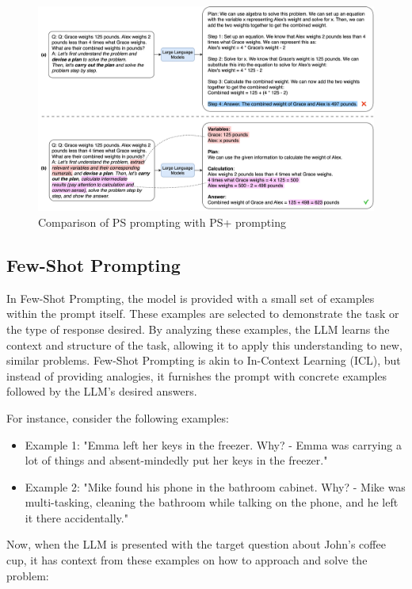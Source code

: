 \documentclass{article}
\begin{document}
\begin{figure}
    \centering
    \includegraphics[width=0.8\linewidth]{math-cot-2.jpg}
    \caption{Comparison of PS prompting with PS+ prompting}
    \label{fig:enter-label}
\end{figure}
\subsection{Few-Shot Prompting}

In Few-Shot Prompting, the model is provided with a small set of examples within the prompt itself. These examples are selected to demonstrate the task or the type of response desired. By analyzing these examples, the LLM learns the context and structure of the task, allowing it to apply this understanding to new, similar problems. Few-Shot Prompting is akin to In-Context Learning (ICL), but instead of providing analogies, it furnishes the prompt with concrete examples followed by the LLM's desired answers. 

For instance, consider the following examples:
\begin{itemize}
    \item Example 1: "Emma left her keys in the freezer. Why? - Emma was carrying a lot of things and absent-mindedly put her keys in the freezer."
    \item Example 2: "Mike found his phone in the bathroom cabinet. Why? - Mike was multi-tasking, cleaning the bathroom while talking on the phone, and he left it there accidentally."
\end{itemize}

Now, when the LLM is presented with the target question about John's coffee cup, it has context from these examples on how to approach and solve the problem:
\end{document}
